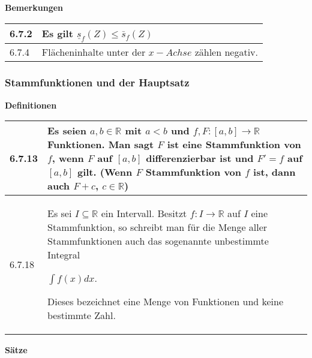     \noindent
    \textbf{Bemerkungen}
    
    \begin{longtable}{p{1cm} p{16cm}}
        \toprule

        6.7.2 & Es gilt $\underline{s}_f(Z) \leq \bar{s}_f(Z)$\\
        \midrule
        6.7.4 & Flächeninhalte unter der $x-Achse$ zählen negativ. \\

        \bottomrule
    \end{longtable}
    

\subsubsection{Stammfunktionen und der Hauptsatz}

    \noindent
    \textbf{Definitionen}
      
    \begin{longtable}{p{1cm} p{16cm}}
        \toprule

        6.7.13& Es seien $a,b \in \mathbb{R}$ mit $a<b$ und $f, F: [a,b] \rightarrow \mathbb{R}$ Funktionen. Man sagt $F$ ist eine
                \textbf{Stammfunktion} von $f$, wenn $F$ auf $[a,b]$ differenzierbar ist und $F' = f$ auf $[a,b]$ gilt. \hfill \break
                (Wenn $F$ Stammfunktion von $f$ ist, dann auch $F + c$, $c \in \mathbb{R}$) \\
        \midrule
        6.7.18& Es sei $I \subseteq \mathbb{R}$ ein Intervall. Besitzt $f: I \rightarrow \mathbb{R}$ auf $I$ eine Stammfunktion, so schreibt
                man für die Menge aller Stammfunktionen auch das sogenannte unbestimmte Integral \hfill \break
                \centerline{$ \int f(x) dx $.}
                Dieses bezeichnet eine Menge von Funktionen und keine bestimmte Zahl. \\

        \bottomrule

    \end{longtable}
    

    \noindent 
    \textbf{Sätze}
    
